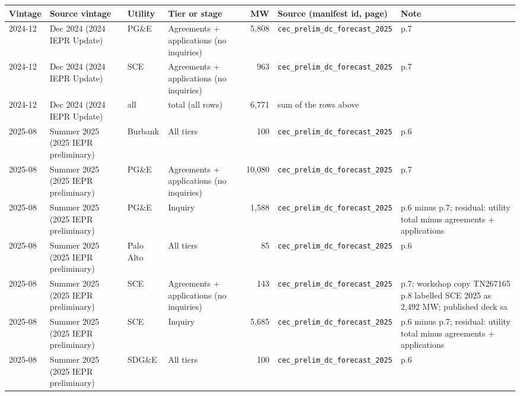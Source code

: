 \begin{tabular}{lp{3.2cm}lp{3.4cm}rp{4.2cm}p{5cm}}
\toprule
Vintage & Source vintage & Utility & Tier or stage & MW & Source (manifest id, page) & Note \\
\midrule
2024-12 & Dec 2024 (2024 IEPR Update) & PG\&E & Agreements + applications (no inquiries) & 5,808 & \texttt{cec\_\allowbreak{}prelim\_\allowbreak{}dc\_\allowbreak{}forecast\_\allowbreak{}2025} & p.7 \\
2024-12 & Dec 2024 (2024 IEPR Update) & SCE & Agreements + applications (no inquiries) & 963 & \texttt{cec\_\allowbreak{}prelim\_\allowbreak{}dc\_\allowbreak{}forecast\_\allowbreak{}2025} & p.7 \\
2024-12 & Dec 2024 (2024 IEPR Update) & all & total (all rows) & 6,771 & sum of the rows above &  \\
\midrule
2025-08 & Summer 2025 (2025 IEPR preliminary) & Burbank & All tiers & 100 & \texttt{cec\_\allowbreak{}prelim\_\allowbreak{}dc\_\allowbreak{}forecast\_\allowbreak{}2025} & p.6 \\
2025-08 & Summer 2025 (2025 IEPR preliminary) & PG\&E & Agreements + applications (no inquiries) & 10,080 & \texttt{cec\_\allowbreak{}prelim\_\allowbreak{}dc\_\allowbreak{}forecast\_\allowbreak{}2025} & p.7 \\
2025-08 & Summer 2025 (2025 IEPR preliminary) & PG\&E & Inquiry & 1,588 & \texttt{cec\_\allowbreak{}prelim\_\allowbreak{}dc\_\allowbreak{}forecast\_\allowbreak{}2025} & p.6 minus p.7; residual: utility total minus agreements + applications \\
2025-08 & Summer 2025 (2025 IEPR preliminary) & Palo Alto & All tiers & 85 & \texttt{cec\_\allowbreak{}prelim\_\allowbreak{}dc\_\allowbreak{}forecast\_\allowbreak{}2025} & p.6 \\
2025-08 & Summer 2025 (2025 IEPR preliminary) & SCE & Agreements + applications (no inquiries) & 143 & \texttt{cec\_\allowbreak{}prelim\_\allowbreak{}dc\_\allowbreak{}forecast\_\allowbreak{}2025} & p.7; workshop copy TN267165 p.8 labelled SCE 2025 as 2,492 MW; published deck sa \\
2025-08 & Summer 2025 (2025 IEPR preliminary) & SCE & Inquiry & 5,685 & \texttt{cec\_\allowbreak{}prelim\_\allowbreak{}dc\_\allowbreak{}forecast\_\allowbreak{}2025} & p.6 minus p.7; residual: utility total minus agreements + applications \\
2025-08 & Summer 2025 (2025 IEPR preliminary) & SDG\&E & All tiers & 100 & \texttt{cec\_\allowbreak{}prelim\_\allowbreak{}dc\_\allowbreak{}forecast\_\allowbreak{}2025} & p.6 \\

\end{tabular}
